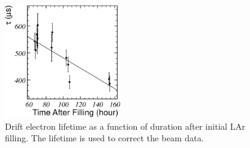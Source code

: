 \begin{figure}[htbp]
 \begin{center}
  \includegraphics[width=50mm]{fig/tauHistory.eps}
 \end{center}
 \caption{Drift electron lifetime as a function of duration after initial LAr filling. The lifetime is used to correct the beam data.}
 \label{fig:CosmicPurity}
\end{figure}

